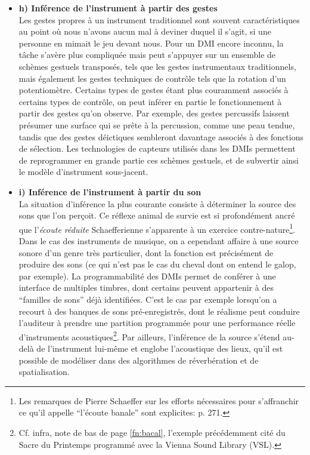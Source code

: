 \begin{itemize}[noitemsep]
	\item \textbf{h) Inférence de l'instrument à partir des gestes}\\
	Les gestes propres à un instrument traditionnel sont souvent caractéristiques au point où nous n'avons aucun mal à deviner duquel il s'agit, si une personne en mimait le jeu devant nous. Pour un \gls{DMI} encore inconnu, la tâche s'avère plus compliquée mais peut s'appuyer sur un ensemble de schèmes gestuels transposés, tels que les gestes instrumentaux traditionnels, mais également les gestes techniques de contrôle tels que la rotation d'un potentiomètre. Certains types de gestes étant plus couramment associés à certains types de contrôle, on peut inférer en partie le fonctionnement à partir des gestes qu'on observe. Par exemple, des gestes percussifs laissent présumer une surface qui se prête à la percussion, comme une peau tendue, tandis que des gestes déictiques sembleront davantage associés à des fonctions de sélection. Les technologies de capteurs utilisés dans les \glspl{DMI} permettent de reprogrammer en grande partie ces schèmes gestuels, et de subvertir ainsi le modèle d'instrument sous-jacent.

	\item \textbf{i) Inférence de l'instrument à partir du son}\\
	\label{sec:gesture:inferences-soudure:inferences:instrument-sound}
	La situation d'inférence la plus courante consiste à déterminer la source des sons que l'on perçoit. Ce réflexe animal de survie est si profondément ancré que l'\textit{écoute réduite} Schaefferienne s'apparente à un exercice contre-nature\footnote{Les remarques de Pierre Schaeffer sur les efforts nécessaires pour s'affranchir ce qu'il appelle ``l'écoute banale'' sont explicites:  \cite{schaeffer_traite_1966} p. 271.}. Dans le cas des instruments de musique, on a cependant affaire à une source sonore d'un genre très particulier, dont la fonction est précisément de produire des sons (ce qui n'est pas le cas du cheval dont on entend le galop, par exemple). La programmabilité des \glspl{DMI} permet de conférer à une interface de multiples timbres, dont certains peuvent appartenir à des ``familles de sons'' déjà identifiées. C'est le cas par exemple lorsqu'on a recourt à des banques de sons pré-enregistrés, dont le réalisme peut conduire l'auditeur à prendre une partition programmée pour une performance réelle d'instruments acoustiques\footnote{Cf. infra, note de bas de page \ref{fn:bacal}, l'exemple précédemment cité du Sacre du Printemps programmé avec la Vienna Sound Library (VSL).}. Par ailleurs, l'inférence de la source s'étend au-delà de l'instrument lui-même et englobe l'acoustique des lieux, qu'il est possible de modéliser dans des algorithmes de réverbération et de spatialisation.


\end{itemize}
